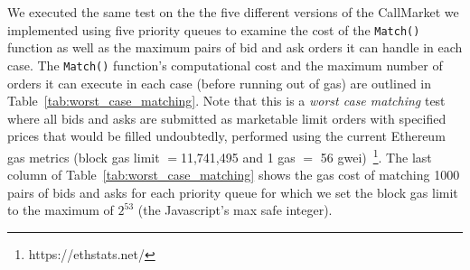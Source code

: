 We executed the same test on the the five different versions of the CallMarket we implemented using five priority queues to examine the cost of the \texttt{Match()} function as well as the maximum pairs of bid and ask orders it can handle in each case. The \texttt{Match()} function's computational cost and the maximum number of orders it can execute in each case (before running out of gas) are outlined in Table~\ref{tab:worst_case_matching}. Note that this is a \textit{worst case matching} test where all bids and asks are submitted as marketable limit orders with specified prices that would be filled undoubtedly, performed using the current Ethereum gas metrics (block gas limit $=$11,741,495 and 1 gas $=$ 56 gwei)~\footnote{https://ethstats.net/}. The last column of Table~\ref{tab:worst_case_matching} shows the gas cost of matching 1000 pairs of bids and asks for each priority queue for which we set the block gas limit to the maximum of  $2^{53}$ (the Javascript's max safe integer).






